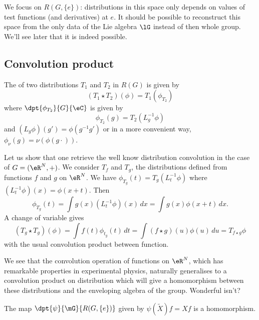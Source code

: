 We focus on $R(G,\{ e \})$: distributions in this space only depends on values of test functions (and derivatives) at $e$. It should be possible to reconstruct this space from the only data of the Lie algebra $\lG$ instead of then whole group. We'll see later that it is indeed possible.

\subsection{Convolution product}

The  of two distributions $T_1$ and $T_2$ in $R(G)$ is given by
\begin{equation}
	(T_1\star T_2)(\phi)=T_1(\phi_{T_2})
\end{equation}
where $\dpt{\phi_{T_2}}{G}{\eC}$ is given by
\begin{equation}
	\phi_{T_2}(g)=T_2(L_g^{-1}\phi)
\end{equation}
and $(L_g\phi)(g')=\phi(g^{-1}g')$ or in a more convenient way, $\phi_{\nu}(g)=\nu(\phi(g\cdot))$.

Let us show that one retrieve the well know distribution convolution in the case of $G=(\eR^N,+)$. We consider $T_f$ and $T_g$, the distributions defined from functions $f$ and $g$ on $\eR^N$. We have $\phi_{T_g}(t)=T_g(L_t^{-1}\phi)$ where $(L_t^{-1}\phi)(x)=\phi(x+t)$. Then
\begin{equation}
	\phi_{T_g}(t)=\int g(x)(L_t^{-1}\phi)(x)\,dx
	=\int g(x)\phi(x+t)\,dx.
\end{equation}
A change of variable gives
\begin{equation}
	(T_g\star T_g)(\phi)=\int f(t)\phi_{t_g}(t)\,dt
	=\int (f\star g)(u)\phi(u)\,du
	= T_{f\star g}\phi
\end{equation}
with the usual convolution product between function.

\begin{remark}
	We see that the convolution operation of functions on $\eR^N$, which has remarkable properties in experimental physics, naturally generalises to a convolution product on distribution which will give a homomorphism between these distributions and the enveloping algebra of the group. Wonderful isn't?
\end{remark}

\begin{lemma}
	The map $\dpt{\psi}{\mG}{R(G,\{ e \})}$ given by $\psi(\tilde X)f=Xf$ is a homomorphism.
\end{lemma}


